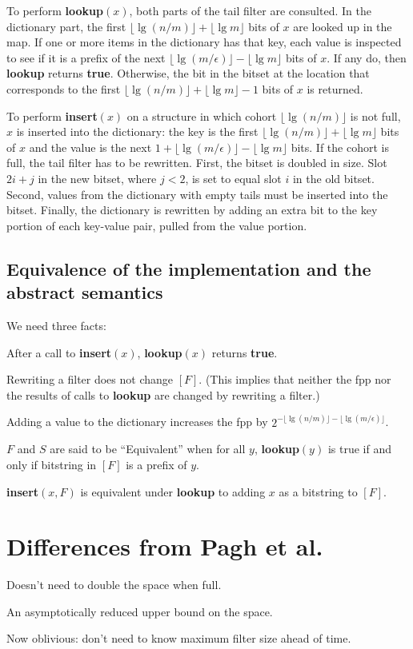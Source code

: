 \documentclass[11pt,letterpaper]{article}
\begin{document}
To perform {\bf lookup$(x)$}, both parts of the tail filter are consulted.
In the dictionary part, the first $\lfloor \lg (n/m) \rfloor + \lfloor \lg m \rfloor$ bits of $x$ are looked up in the map.
If one or more items in the dictionary has that key, each value is inspected to see if it is a prefix of the next $\lfloor \lg(m/\epsilon) \rfloor - \lfloor \lg m \rfloor$ bits of $x$.
If any do, then {\bf lookup} returns {\bf true}.
Otherwise, the bit in the bitset at the location that corresponds to the first $\lfloor \lg (n/m) \rfloor + \lfloor \lg m \rfloor - 1$ bits of $x$ is returned.

To perform {\bf insert$(x)$} on a structure in which cohort $\lfloor \lg (n/m) \rfloor$ is not full, $x$ is inserted into the dictionary: the key is the first $\lfloor \lg (n/m) \rfloor + \lfloor \lg m \rfloor$ bits of $x$ and the value is the next $1 + \lfloor \lg (m/\epsilon) \rfloor - \lfloor \lg m \rfloor$ bits.
If the cohort is full, the tail filter has to be rewritten.
First, the bitset is doubled in size.
Slot $2i + j$ in the new bitset, where $j < 2$, is set to equal slot $i$ in the old bitset.
Second, values from the dictionary with empty tails must be inserted into the bitset.
Finally, the dictionary is rewritten by adding an extra bit to the key portion of each key-value pair, pulled from the value portion.

\subsection{Equivalence of the implementation and the abstract semantics}

We need three facts:

After a call to {\bf insert$(x)$}, {\bf lookup$(x)$} returns {\bf true}.


Rewriting a filter does not change $[F]$. (This implies that neither the fpp nor the results of calls to {\bf lookup} are changed by rewriting a filter.)

Adding a value to the dictionary increases the fpp by $2^{-\lfloor \lg (n/m) \rfloor - \lfloor \lg (m/\epsilon) \rfloor}$.

$F$ and $S$ are said to be ``Equivalent'' when for all $y$, {\bf lookup$(y)$} is true if and only if bitstring in $[F]$ is a prefix of $y$.

{\bf insert$(x, F)$} is equivalent under {\bf lookup} to adding $x$ as a bitstring to $[F]$.

\section{Differences from Pagh et al.}

Doesn't need to double the space when full.

An asymptotically reduced upper bound on the space.

Now oblivious: don't need to know maximum filter size ahead of time.

{}

\end{document}

